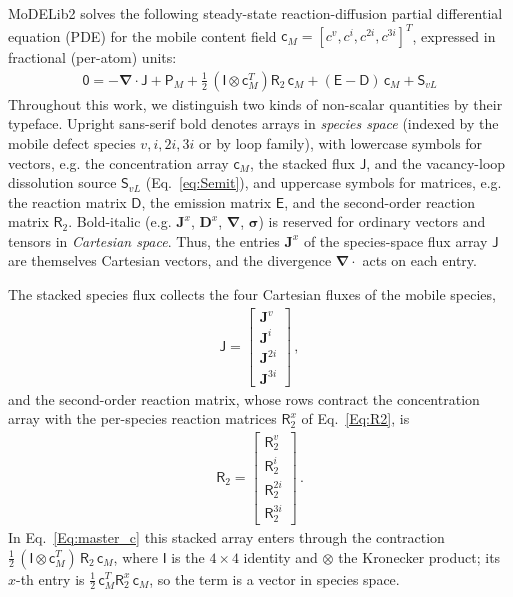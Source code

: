 \documentclass{article}
\newcommand{\spvec}[1]{\bm{\mathsf{#1}}}   %
\newcommand{\spmat}[1]{\bm{\mathsf{#1}}}   %
\begin{document}
MoDELib2 solves the following steady-state reaction-diffusion partial differential equation (PDE) for the mobile content field $\spvec{c}_M=[c^v,c^i,c^{2i},c^{3i}]^T$, expressed in fractional (per-atom) units:
\begin{align}
\label{Eq:master_c}
    \spvec{0} = - \bm \nabla \cdot
\spvec{J}
+ \spvec{P}_{M}+\tfrac{1}{2}\,(\spmat{I}\otimes\spvec{c}_M^T)\spmat{R}_2\,\spvec{c}_{M}
+ (\spmat{E}-\spmat{D})\,\spvec{c}_{M}+\spvec{S}_{vL}
\end{align}
Throughout this work, we distinguish two kinds of non-scalar quantities by their typeface. Upright sans-serif bold denotes arrays in \emph{species space} (indexed by the mobile defect species $v,i,2i,3i$ or by loop family), with lowercase symbols for vectors, e.g. the concentration array $\spvec{c}_M$, the stacked flux $\spvec{J}$, and the vacancy-loop dissolution source $\spvec{S}_{vL}$ (Eq.~\ref{eq:Semit}), and uppercase symbols for matrices, e.g. the reaction matrix $\spmat{D}$, the emission matrix $\spmat{E}$, and the second-order reaction matrix $\spmat{R}_2$. Bold-italic (e.g. $\bm J^x$, $\bm D^x$, $\bm\nabla$, $\bm\sigma$) is reserved for ordinary vectors and tensors in \emph{Cartesian space}. Thus, the entries $\bm J^x$ of the species-space flux array $\spvec{J}$ are themselves Cartesian vectors, and the divergence $\bm\nabla\cdot$ acts on each entry.

The stacked species flux collects the four Cartesian fluxes of the mobile species,
\begin{align}\label{eq:Jdef}
\spvec{J}=\begin{bmatrix}
 \bm{J}^v \\
 \bm{J}^i \\
 \bm{J}^{2i} \\
 \bm{J}^{3i}
\end{bmatrix}\, ,
\end{align}
and the second-order reaction matrix, whose rows contract the concentration array with the per-species reaction matrices $\spmat{R}_2^x$ of Eq.~\eqref{Eq:R2}, is
\begin{align}\label{eq:R2def}
\spmat{R}_2=\begin{bmatrix}
\spmat{R}_{2}^{v} \\
\spmat{R}_{2}^{i} \\
\spmat{R}_{2}^{2i} \\
\spmat{R}_{2}^{3i}
\end{bmatrix}\, .
\end{align}
In Eq.~\eqref{Eq:master_c} this stacked array enters through the contraction $\tfrac{1}{2}\,(\spmat{I}\otimes\spvec{c}_M^T)\,\spmat{R}_2\,\spvec{c}_{M}$, where $\spmat{I}$ is the $4\times4$ identity and $\otimes$ the Kronecker product; its $x$-th entry is $\tfrac{1}{2}\,\spvec{c}_M^T\spmat{R}_2^{x}\,\spvec{c}_{M}$, so the term is a vector in species space.
\end{document}
